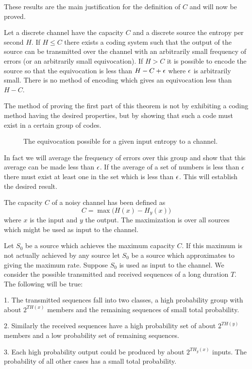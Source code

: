 These results are the main justification for the definition of $C$ and
will now be proved.

\begin{theorem}
\label{thm:11}
Let a discrete channel have the capacity $C$ and a discrete source
the entropy per second $H$.  If $H \le C$ there exists a coding system
such that the output of the source can be transmitted over the channel
with an arbitrarily small frequency of errors (or an arbitrarily small
equivocation).  If $H>C$ it is possible to encode the source so that the
equivocation is less than $H-C+\epsilon$ where $\epsilon$ is arbitrarily small.
There is no method of encoding which gives an equivocation less than
$H-C$.
\end{theorem}

The method of proving the first part of this theorem is not by exhibiting
a coding method having the desired properties, but by showing that such
a code must exist in a certain group of codes.
\begin{figure}[ht]
\centerline{}
\caption{The equivocation possible for a given input entropy to a channel.}
\label{fig:9}
\end{figure}
In fact we will average the frequency of errors over this group and
show that this average can be made less than $\epsilon$.
If the average of a set of numbers is less than $\epsilon$ there must exist
at least one in the set which is less than $\epsilon$.  This will establish
the desired result.

The capacity $C$ of a noisy channel has been defined as
$$
C= \max\bigl(H(x) - H_y(x)\bigr)
$$
where $x$ is the input and $y$ the output.  The maximization is over
all sources which might be used as input to the channel.

Let $S_0$ be a source which achieves the maximum capacity $C$.  If this
maximum is not actually achieved by any source
let $S_0$ be a source which approximates to giving the maximum
rate.  Suppose $S_0$ is used as input to the channel.  We consider the
possible transmitted and received sequences of a long duration $T$.
The following will be true:

1. The transmitted sequences fall into two classes, a high probability
group with about $2^{T H(x)}$ members and the remaining sequences of
small total probability.

2. Similarly the received sequences have a high probability set of about
$2^{T H(y)}$ members and a low probability set of remaining sequences.

3. Each high probability output could be produced by about $2^{T H_y(x)}$
inputs.  The probability of all other cases has a small total
probability.


